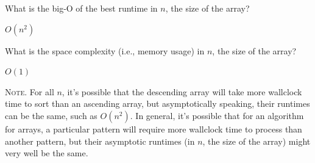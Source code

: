 \nextq
What is the big-O of the best runtime in $n$, the size of the array?
\\
\ANSWER
\begin{answerlong}
$O(n^2)$
\end{answerlong}

\nextq
What is the space complexity (i.e., memory usage)
in $n$, the size of the array?
\\
\ANSWER
\begin{answerlong}
$O(1)$
\end{answerlong}

\textsc{Note.}
For all $n$, it's possible that the descending array will take more
wallclock time to sort than an ascending array, but
asymptotically speaking, their runtimes can be the same, such as $O(n^2)$.
In general, it's possible that for an algorithm for arrays,
a particular pattern will require more wallclock time to process
than another pattern, but their asymptotic runtimes (in $n$, the size
of the array) might very well be the same.


